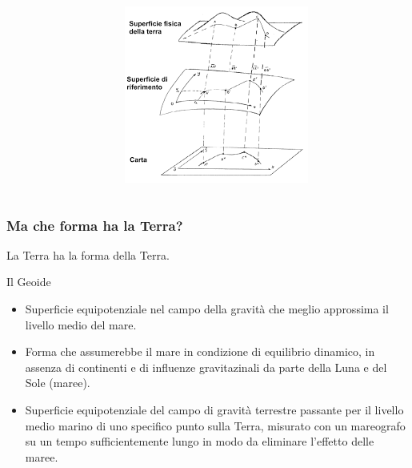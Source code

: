 \documentclass{beamer}
\begin{document}
{\begin{frame}
\begin{columns}
\begin{column}{0.7\textwidth}
        \end{column}
        \begin{column}{0.3\textwidth}
            \begin{center}
                \includegraphics[width=\textwidth] {./pics_2022_03/refsup.png}	
            \end{center}
        \end{column}
        
    \end{columns}

\end{frame}

\begin{frame}
    \frametitle{Ma che forma ha la Terra?}

    La Terra ha la forma della Terra.
    
    \begin{block}{Il Geoide}
        \begin{itemize}
            \item Superficie equipotenziale nel campo della gravità che meglio
            approssima il livello medio del mare.
            \item Forma che assumerebbe il mare in condizione di equilibrio dinamico,
            in assenza di continenti e di influenze gravitazinali da parte della Luna
            e del Sole (maree).
            \item Superficie equipotenziale del campo di gravità terrestre passante
            per il livello medio marino di uno specifico punto sulla Terra, misurato
            con un mareografo su un tempo sufficientemente lungo in modo da eliminare
            l'effetto delle maree.
        \end{itemize}
    \end{block}


\end{frame}}
\end{document}
